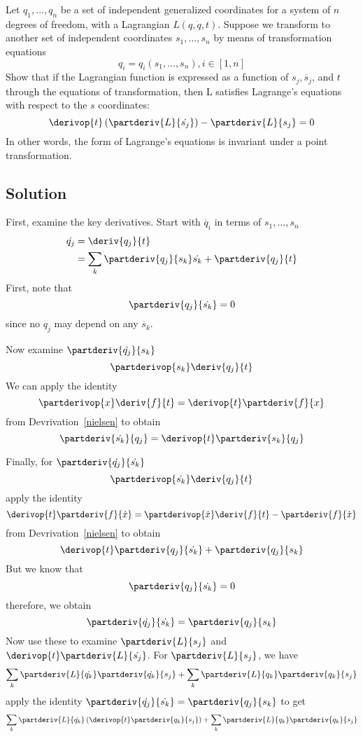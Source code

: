 Let $q_1,\ldots,q_n$ be a set of independent generalized coordinates
for a system of $n$ degrees of freedom, with a Lagrangian $L(q,
\dot{q}, t)$.  Suppose we transform to another set of independent
coordinates $s_1,\ldots,s_n$ by means of transformation equations
\[q_i = q_i(s_1, \ldots, s_n), i\in[1,n]\]
Show that if the Lagrangian function is expressed as a function of
$s_j,\dot{s_j}$, and $t$ through the equations of transformation, then
L satisfies Lagrange's equations with respect to the $s$ coordinates:
\[ \derivop{t}\left(\partderiv{L}{\dot{s_j}}\right) - \partderiv{L}{s_j} = 0 \]
In other words, the form of Lagrange's equations is invariant under a
point transformation.

\subsection*{Solution}

First, examine the key derivatives.  Start with $\dot{q_i}$ in terms
of $s_1,\ldots,s_n$
\begin{align*}
  \dot{q_j} &= \deriv{q_j}{t} \\
  &= \sum_k\partderiv{q_j}{s_k}\dot{s_k} + \partderiv{q_j}{t}
\end{align*}
First, note that
\[\partderiv{q_j}{\dot{s_k}} = 0\]
since no $q_j$ may depend on any $\dot{s_k}$.

Now examine $\partderiv{\dot{q_j}}{s_k}$
\[ \partderivop{s_k}\deriv{q_j}{t} \]
We can apply the identity
\[ \partderivop{x}\deriv{f}{t} = \derivop{t}\partderiv{f}{x} \]
from Devrivation~\ref{nielsen} to obtain
\[ \partderiv{\dot{s_k}}{q_j} = \derivop{t}\partderiv{s_k}{q_j} \]

Finally, for $\partderiv{\dot{q_j}}{\dot{s_k}}$
\[ \partderivop{\dot{s_k}}\deriv{q_j}{t} \]
apply the identity
\[
\derivop{t}\partderiv{f}{\dot{x}}
=
\partderivop{\dot{x}}\deriv{f}{t} - \partderiv{f}{\dot{x}}
\]
from Devrivation~\ref{nielsen} to obtain
\[ \derivop{t}\partderiv{q_j}{\dot{s_k}} + \partderiv{q_j}{s_k} \]
But we know that
\[\partderiv{q_j}{\dot{s_k}} = 0\]
therefore, we obtain
\[ \partderiv{\dot{q_j}}{\dot{s_k}} = \partderiv{q_j}{s_k} \]
Now use these to examine $\partderiv{L}{s_j}$ and
$\derivop{t}\partderiv{L}{\dot{s_j}}$.  For $\partderiv{L}{s_j}$, we
have
\[
\sum_k\partderiv{L}{\dot{q_k}}\partderiv{\dot{q_k}}{s_j}
+\sum_k\partderiv{L}{q_k}\partderiv{q_k}{s_j}\]
apply the identity $\partderiv{\dot{q_j}}{\dot{s_k}} =
\partderiv{q_j}{s_k}$ to get
\[
\sum_k\partderiv{L}{\dot{q_k}}\left(\derivop{t}\partderiv{q_k}{s_j}\right)
+\sum_k\partderiv{L}{q_k}\partderiv{q_k}{s_j}
\]


